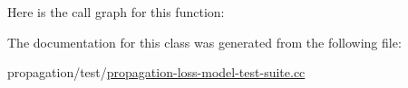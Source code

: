 Here is the call graph for this function\+:




The documentation for this class was generated from the following file\+:\begin{DoxyCompactItemize}
\item 
propagation/test/\hyperlink{propagation-loss-model-test-suite_8cc}{propagation-\/loss-\/model-\/test-\/suite.\+cc}\end{DoxyCompactItemize}
